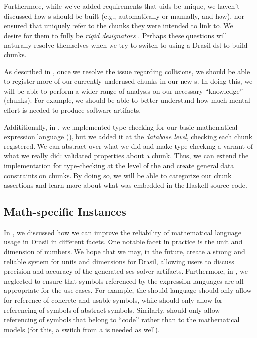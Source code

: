 Furthermore, while we've added requirements that \acsp{uid} be unique, we
haven't discussed how \UID{}s should be built (e.g., automatically or manually,
and how), nor ensured that \UID{} uniquely refer to the chunks they were
intended to link to. We desire for them to fully be \textit{rigid designators}
\cite{Kripke1972NandN}. Perhaps these questions will naturally resolve
themselves when we try to switch to using a Drasil \acs{dsl} to build chunks.

As described in , once we resolve the issue regarding
\UID{} collisions, we should be able to register more of our currently underused
chunks in our new \ChunkDB{}s. In doing this, we will be able to perform a wider
range of analysis on our necessary ``knowledge'' (chunks). For example, we
should be able to better understand how much mental effort is needed to produce
software artifacts.

Addititionally, in
,
we implemented type-checking for our basic mathematical expression language
(\Expr{}), but we added it at the \textit{database level}, checking each chunk
registered. We can abstract over what we did and make type-checking a variant of
what we really did: validated properties about a chunk. Thus, we can extend the
implementation for type-checking at the level of the \ChunkDB{} and create
general data constraints on chunks. By doing so, we will be able to categorize
our chunk assertions and learn more about what was embedded in the Haskell
source code.

\subsection{Math-specific Instances}
\label{chap:futureWork:sec:chunks:sub:mathSpecific}

In , we discussed how we can improve the
reliability of mathematical language usage in Drasil in different facets. One
notable facet in practice is the unit and dimension of numbers. We hope that we
may, in the future, create a strong and reliable system for units and dimensions
for Drasil, allowing users to discuss precision and accuracy of the generated
\acs{scs} solver artifacts. Furthermore, in , we neglected
to ensure that symbols referenced by the expression languages are all
appropriate for the use-cases. For example, the \Expr{} should language should
only allow for reference of concrete and usable symbols, while \ModelExpr{}
should only allow for referencing of symbols of abstract symbols. Similarly,
\CodeExpr{} should only allow referencing of symbols that belong to ``code''
rather than to the mathematical models (for this, a switch from a
\QuantityDict{} is needed as well).

